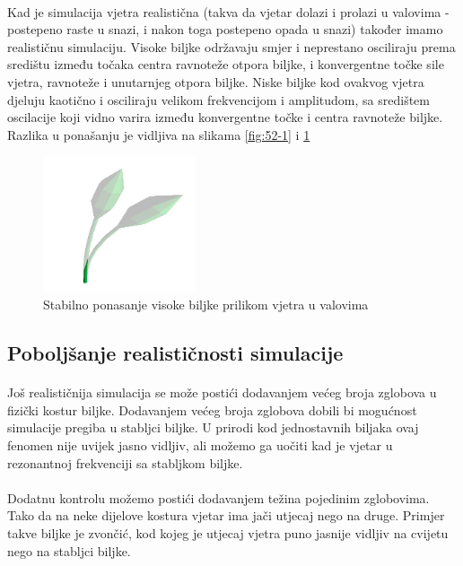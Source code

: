 \documentclass[times, utf8, diplomski]{fer}
\begin{document}
\paragraph{}
Kad je simulacija vjetra realistična (takva da vjetar dolazi i prolazi u 
valovima - postepeno raste u snazi, i nakon toga postepeno opada u snazi) 
također imamo realističnu simulaciju. Visoke biljke održavaju smjer i neprestano 
osciliraju prema središtu između točaka centra ravnoteže otpora biljke, i 
konvergentne točke sile vjetra, ravnoteže i unutarnjeg otpora biljke. Niske 
biljke kod ovakvog vjetra djeluju kaotično i osciliraju velikom frekvencijom i 
amplitudom, sa središtem oscilacije koji vidno varira između konvergentne točke 
i centra ravnoteže biljke. Razlika u ponašanju je vidljiva na slikama \ref{fig:52-1} i \ref{fig:52-2}
\begin{figure}[h]
	\centering
	\includegraphics[width=0.4\textwidth]{img/52-2}
	\caption{Stabilno ponasanje visoke biljke prilikom vjetra u valovima}
	\label{fig:52-2}
\end{figure}

\subsection{Poboljšanje realističnosti simulacije}
\paragraph{}
Još realističnija simulacija se može postići dodavanjem većeg broja zglobova u
fizički kostur biljke. Dodavanjem većeg broja zglobova dobili bi mogućnost 
simulacije pregiba u stabljci biljke. U prirodi kod jednostavnih biljaka ovaj 
fenomen nije uvijek jasno vidljiv, ali možemo ga uočiti kad je vjetar u 
rezonantnoj frekvenciji sa stabljkom biljke.
\paragraph{}
Dodatnu kontrolu možemo postići dodavanjem težina pojedinim zglobovima. Tako da 
na neke dijelove kostura vjetar ima jači utjecaj nego na druge. Primjer takve 
biljke je zvončić, kod kojeg je utjecaj vjetra puno jasnije vidljiv na cvijetu 
nego na stabljci biljke.
\end{document}
